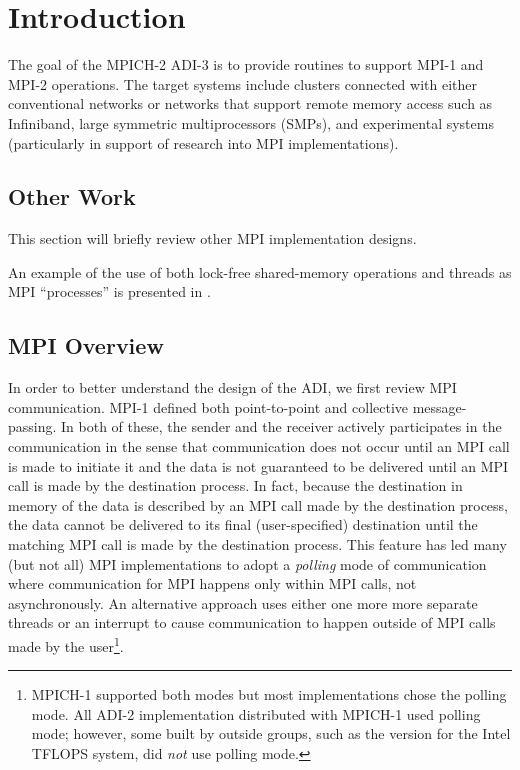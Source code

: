 %
%

\section{Introduction}
The goal of the MPICH-2 ADI-3 is to provide routines to support MPI-1
and MPI-2 operations.  The target systems include clusters connected
with either conventional networks or networks that support remote
memory access such as Infiniband, large symmetric multiprocessors
(SMPs), and experimental systems (particularly in support of research
into MPI implementations).  

\subsection{Other Work}
\label{sec:other-work}
This section will briefly review other MPI implementation designs.

An example of the use of both lock-free shared-memory operations and threads
as MPI ``processes'' is presented in \cite{tang00:mpi-impl}.  

\subsection{MPI Overview}
In order to better understand the design of the ADI, we first review
MPI communication.  MPI-1 defined both point-to-point and collective
message-passing.  In both of these, the sender and the receiver
actively participates in the communication in the sense that
communication does not occur until an MPI call is made to initiate it
and the data is not guaranteed to be delivered until an MPI call is
made by the destination process.  In fact, because the destination in memory of
the data is described by an MPI call made by the destination process, the
data cannot be delivered to its final (user-specified) destination
until the matching MPI call is made by the destination process.  This feature
has led many (but not all) MPI implementations to adopt a
\emph{polling} mode of communication where communication for MPI
happens only within MPI calls, not asynchronously.  An alternative
approach uses either one more more separate threads or an interrupt to
cause communication to happen outside of MPI calls made by the
user\footnote{MPICH-1 supported both modes but most implementations chose the
  polling mode.  All ADI-2 implementation distributed with MPICH-1 used
  polling mode; however, some built by outside groups, such as the version for the Intel TFLOPS system, did \emph{not} use polling mode.}.

